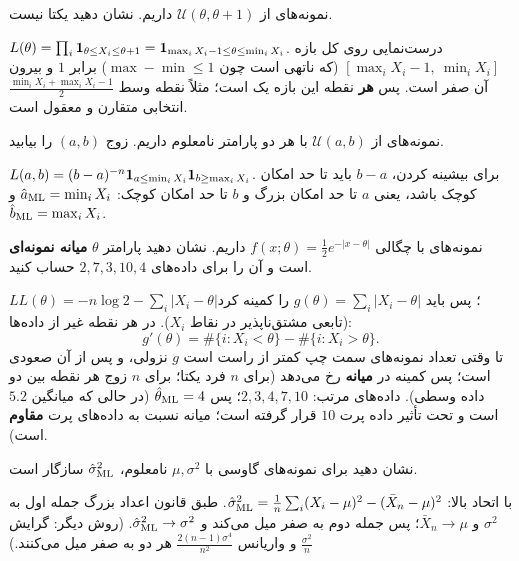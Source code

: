 \begin{exercise}
نمونه‌های  از $\mathcal U(\theta,\theta+1)$ داریم. نشان دهید  یکتا نیست.
\end{exercise}
\begin{solution}
$L(\theta)=\prod_i\mathbf{1}_{\theta\le X_i\le\theta+1}=\mathbf{1}_{\max_iX_i-1\le\theta\le\min_iX_i}$. درست‌نمایی روی کل بازه $[\max_iX_i-1,\ \min_iX_i]$ (که ناتهی است چون $\max-\min\le1$) برابر $1$ و بیرون آن صفر است. پس \textbf{هر} نقطه این بازه یک  است؛ مثلاً نقطه وسط $\frac{\min_iX_i+\max_iX_i-1}{2}$ انتخابی متقارن و معقول است.
\end{solution}

\begin{exercise}
نمونه‌های  از $\mathcal U(a,b)$ با هر دو پارامتر نامعلوم داریم.  زوج $(a,b)$ را بیابید.
\end{exercise}
\begin{solution}
$L(a,b)=(b-a)^{-n}\mathbf{1}_{a\le\min_iX_i}\mathbf{1}_{b\ge\max_iX_i}$. برای بیشینه کردن، $b-a$ باید تا حد امکان کوچک باشد، یعنی $a$ تا حد امکان بزرگ و $b$ تا حد امکان کوچک: $\hat a_{\mathrm{ML}}=\min_iX_i$ و $\hat b_{\mathrm{ML}}=\max_iX_i$.
\end{solution}

\begin{exercise}
نمونه‌های  با چگالی $f(x;\theta)=\frac12e^{-|x-\theta|}$ داریم. نشان دهید  پارامتر $\theta$ \textbf{میانه نمونه‌ای} است و آن را برای داده‌های $2,7,3,10,4$ حساب کنید.
\end{exercise}
\begin{solution}
$LL(\theta)=-n\log2-\sum_i|X_i-\theta|$؛ پس باید $g(\theta)=\sum_i|X_i-\theta|$ را کمینه کرد (تابعی مشتق‌ناپذیر در نقاط $X_i$). در هر نقطه غیر از داده‌ها:
\[
g'(\theta)=\#\{i:X_i<\theta\}-\#\{i:X_i>\theta\}.
\]
تا وقتی تعداد نمونه‌های سمت چپ کمتر از راست است $g$ نزولی، و پس از آن صعودی است؛ پس کمینه در \textbf{میانه} رخ می‌دهد (برای $n$ فرد یکتا؛ برای $n$ زوج هر نقطه بین دو داده وسطی). داده‌های مرتب: $2,3,4,7,10$؛ پس $\hat\theta_{\mathrm{ML}}=4$ (در حالی که میانگین $5.2$ است و تحت تأثیر داده پرت $10$ قرار گرفته است؛ میانه نسبت به داده‌های پرت \textbf{مقاوم} است).
\end{solution}

\begin{exercise}
نشان دهید برای نمونه‌های گاوسی با $\mu,\sigma^2$ نامعلوم، $\hat\sigma^2_{\mathrm{ML}}$ سازگار است.
\end{exercise}
\begin{solution}
با اتحاد بالا: $\hat\sigma^2_{\mathrm{ML}}=\frac1n\sum_i(X_i-\mu)^2-(\bar X_n-\mu)^2$. طبق قانون اعداد بزرگ جمله اول به $\sigma^2$ و $\bar X_n\to\mu$؛ پس جمله دوم به صفر میل می‌کند و $\hat\sigma^2_{\mathrm{ML}}\to\sigma^2$. (روش دیگر: گرایش $\frac{\sigma^2}{n}$ و واریانس $\frac{2(n-1)\sigma^4}{n^2}$ هر دو به صفر میل می‌کنند.)
\end{solution}
